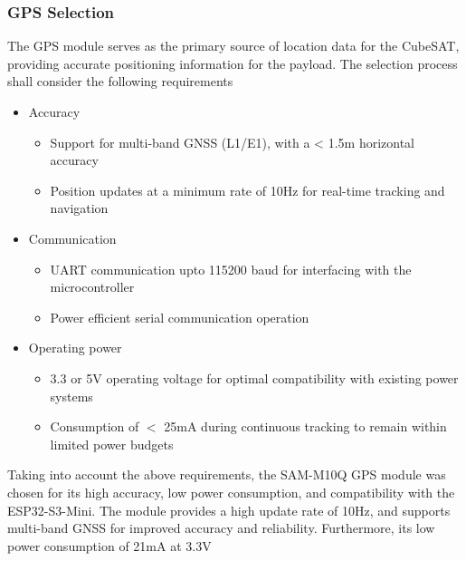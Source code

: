 \documentclass{report}
\begin{document}
                \subsubsection{GPS Selection}
                    The GPS module serves as the primary source of location data for the
                    CubeSAT, providing accurate positioning information for the payload. 
                    The selection process shall consider the following requirements
                    \begin{itemize}
                        \item Accuracy
                        \begin{itemize}
                            \item Support for multi-band GNSS (L1/E1), with a < 1.5m horizontal accuracy
                            \item Position updates at a minimum rate of 10Hz for real-time tracking and navigation
                        \end{itemize}
                        \item Communication
                        \begin{itemize}
                            \item UART communication upto 115200 baud for interfacing with the microcontroller
                            \item Power efficient serial communication operation
                        \end{itemize}
                        \item Operating power
                        \begin{itemize}
                            \item 3.3 or 5V operating voltage for optimal compatibility with existing power systems
                            \item Consumption of $<$ 25mA during continuous tracking to remain within limited power budgets
                        \end{itemize}
                    \end{itemize}
                    Taking into account the above requirements, the SAM-M10Q GPS module was chosen 
                    for its high accuracy, low power consumption, and compatibility with the ESP32-S3-Mini.
                    The module provides a high update rate of 10Hz, and supports multi-band GNSS for
                    improved accuracy and reliability. Furthermore, its low power consumption of 21mA at 3.3V
\end{document}
